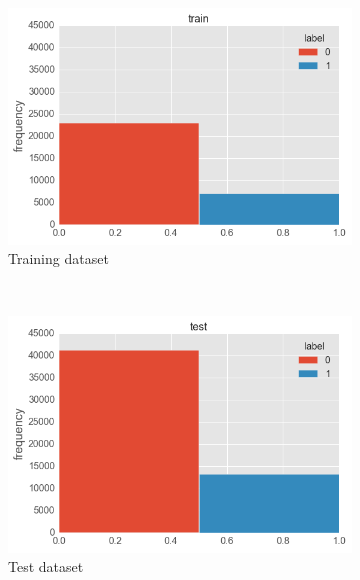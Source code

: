 \documentclass[]{article}
\begin{document}
\begin{figure}[htpb!]
	\centering
    \begin{subfigure}[r]{0.5\textwidth}
		\centering
		\includegraphics[width=\linewidth]{./images/2_dataset}
		\caption{Training dataset \label{img:train_dataset}}
				 
    \end{subfigure}%
    ~
    \begin{subfigure}[l]{0.5\textwidth}
		\centering
		\includegraphics[width=\linewidth]{./images/2_dataset_test}
		\caption{Test dataset\label{img:test_dataset}}
    \end{subfigure}%
    \caption{\label{img:dataset}}
   
\end{figure} 

\pagebreak
\end{document}
